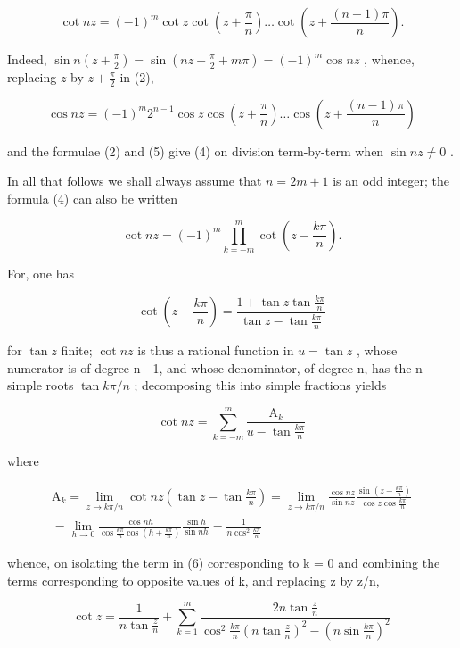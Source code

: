 \[
\cot n z = (- 1) ^ {m} \cot z \cot \left(z + \frac {\pi}{n}\right) \dots \cot \left(z + \frac {(n - 1) \pi}{n}\right).\tag{4}
\]

Indeed, \(\sin n\left(z + \frac{\pi}{2}\right) = \sin \left(nz + \frac{\pi}{2} + m\pi\right) = (-1)^m\cos nz\) , whence, replacing \(z\) by \(z + \frac{\pi}{2}\) in (2),

\[
\cos n z = (- 1) ^ {m} 2 ^ {n - 1} \cos z \cos \left(z + \frac {\pi}{n}\right) \dots \cos \left(z + \frac {(n - 1) \pi}{n}\right)\tag{5}
\]

and the formulae (2) and (5) give (4) on division term-by-term when \(\sin nz \neq 0\) .

In all that follows we shall always assume that \(n = 2m + 1\) is an odd integer; the formula (4) can also be written

\[
\cot n z = (- 1) ^ {m} \prod_ {k = - m} ^ {m} \cot \left(z - \frac {k \pi}{n}\right).
\]

For, one has

\[
\cot \left(z - \frac {k \pi}{n}\right) = \frac {1 + \tan z \tan \frac {k \pi}{n}}{\tan z - \tan \frac {k \pi}{n}}
\]

for \(\tan z\) finite; \(\cot nz\) is thus a rational function in \(u = \tan z\) , whose numerator is of degree n - 1, and whose denominator, of degree n, has the n simple roots \(\tan k\pi/n\) ; decomposing this into simple fractions yields

\[
\cot n z = \sum_ {k = - m} ^ {m} \frac {\mathrm{A} _ {k}}{u - \tan \frac {k \pi}{n}}\tag{6}
\]

where

\[
\begin{array}{l}\mathrm{A} _ {k} = \lim _ {z \rightarrow k \pi / n} \cot n z \left(\tan z - \tan \frac {k \pi}{n}\right) = \lim _ {z \rightarrow k \pi / n} \frac {\cos n z}{\sin n z} \frac {\sin \left(z - \frac {k \pi}{n}\right)}{\cos z \cos \frac {k \pi}{n}}\\= \lim _ {h \rightarrow 0} \frac {\cos n h}{\cos \frac {k \pi}{n} \cos \left(h + \frac {k \pi}{n}\right)} \frac {\sin h}{\sin n h} = \frac {1}{n \cos^ {2} \frac {k \pi}{n}}\end{array}
\]

whence, on isolating the term in (6) corresponding to k = 0 and combining the terms corresponding to opposite values of k, and replacing z by z/n,

\[
\cot z = \frac {1}{n \tan \frac {z}{n}} + \sum_ {k = 1} ^ {m} \frac {2 n \tan \frac {z}{n}}{\cos^ {2} \frac {k \pi}{n} \left(n \tan \frac {z}{n}\right) ^ {2} - \left(n \sin \frac {k \pi}{n}\right) ^ {2}}\tag{7}
\]

